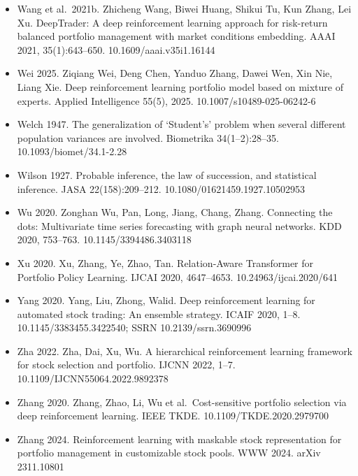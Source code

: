 \documentclass[12pt,a4paper]{report}
\begin{document}
\begin{itemize}
  Wang et al.~2021a. Rundong Wang, Hongxin Wei, Bo An, Zhouyan Feng, Jun
  Yao. Commission fee is not enough: A hierarchical reinforced framework
  for portfolio management. AAAI 2021, 35(1):626--633.
  10.1609/aaai.v35i1.16142
\item
  Wang et al.~2021b. Zhicheng Wang, Biwei Huang, Shikui Tu, Kun Zhang,
  Lei Xu. DeepTrader: A deep reinforcement learning approach for
  risk-return balanced portfolio management with market conditions
  embedding. AAAI 2021, 35(1):643--650. 10.1609/aaai.v35i1.16144
\item
  Wei 2025. Ziqiang Wei, Deng Chen, Yanduo Zhang, Dawei Wen, Xin Nie,
  Liang Xie. Deep reinforcement learning portfolio model based on
  mixture of experts. Applied Intelligence 55(5), 2025.
  10.1007/s10489-025-06242-6
\item
  Welch 1947. The generalization of `Student's' problem when several
  different population variances are involved. Biometrika
  34(1--2):28--35. 10.1093/biomet/34.1-2.28
\item
  Wilson 1927. Probable inference, the law of succession, and
  statistical inference. JASA 22(158):209--212.
  10.1080/01621459.1927.10502953
\item
  Wu 2020. Zonghan Wu, Pan, Long, Jiang, Chang, Zhang. Connecting the
  dots: Multivariate time series forecasting with graph neural networks.
  KDD 2020, 753--763. 10.1145/3394486.3403118
\item
  Xu 2020. Xu, Zhang, Ye, Zhao, Tan. Relation-Aware Transformer for
  Portfolio Policy Learning. IJCAI 2020, 4647--4653.
  10.24963/ijcai.2020/641
\item
  Yang 2020. Yang, Liu, Zhong, Walid. Deep reinforcement learning for
  automated stock trading: An ensemble strategy. ICAIF 2020, 1--8.
  10.1145/3383455.3422540; SSRN 10.2139/ssrn.3690996
\item
  Zha 2022. Zha, Dai, Xu, Wu. A hierarchical reinforcement learning
  framework for stock selection and portfolio. IJCNN 2022, 1--7.
  10.1109/IJCNN55064.2022.9892378
\item
  Zhang 2020. Zhang, Zhao, Li, Wu et al.~Cost-sensitive portfolio
  selection via deep reinforcement learning. IEEE TKDE.
  10.1109/TKDE.2020.2979700
\item
  Zhang 2024. Reinforcement learning with maskable stock representation
  for portfolio management in customizable stock pools. WWW 2024. arXiv
  2311.10801
\end{itemize}
\end{document}
